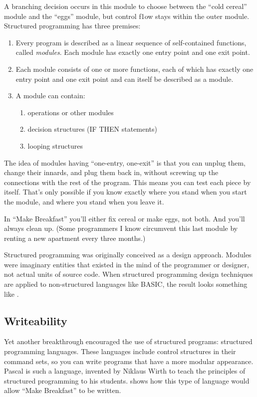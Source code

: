A branching decision occurs in this module to choose between the
{}``cold cereal'' module and the {}``eggs'' module, but control f1ow stays
within the outer module. Structured programming has three premises:

\begin{enumerate}
\item Every program is described as a linear sequence of self-contained
functions, called \emph{modules}. Each module has exactly one entry
point and one exit point.
\item Each module consists of one or more functions, each of which has exactly
one entry point and one exit point and can itself be described as
a module.
\item A module can contain:

\begin{enumerate}
\item operations or other modules
\item decision structures (IF THEN statements)
\item looping structures
\end{enumerate}
\end{enumerate}
The idea of modules having {}``one-entry, one-exit'' is that you
can unplug them, change their innards, and plug them back in, without
screwing up the connections with the rest of the program. This means
you can test each piece by itself. That's only possible if you know
exactly where you stand when you start the module, and where you stand
when you leave it.

In {}``Make Breakfast'' you'll either fix cereal or make eggs, not
both. And you'll always clean up. (Some programmers I know circumvent
this last module by renting a new apartment every three months.)

%

Structured programming was originally conceived as a design approach.
Modules were imaginary entities that existed in the mind of the programmer
or designer, not actual units of source code. When structured programming
design techniques are applied to non-structured languages like BASIC,
the result looks something like .


\subsection{Writeability}
Yet another breakthrough encouraged the use of structured programs:
structured programming languages. These languages include control
structures in their command sets, so you can write programs that have
a more modular appearance. Pascal is such a language, invented by
Niklaus Wirth to teach the principles of structured programming to
his students.  shows how this type of language would allow
{}``Make Breakfast'' to be written.


